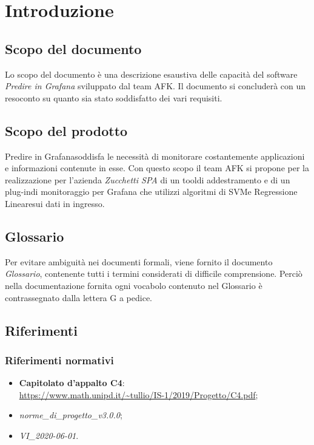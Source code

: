 \section{Introduzione}

\subsection{Scopo del documento}
Lo scopo del documento è una descrizione esaustiva delle capacità del software \textit{Predire in Grafana} sviluppato dal team AFK.
Il documento si concluderà con un resoconto su quanto sia stato soddisfatto dei vari requisiti.

\subsection{Scopo del prodotto}
Predire in Grafana\glo soddisfa le necessità di monitorare costantemente applicazioni e informazioni contenute in esse. 
Con questo scopo il team AFK si propone per la realizzazione per l’azienda \textit{Zucchetti SPA} di un tool\glo di addestramento e di un plug-in\glo di monitoraggio per Grafana che utilizzi algoritmi di SVM\glo e Regressione Lineare\glo sui dati in ingresso.


\subsection{Glossario}
Per evitare ambiguità nei documenti formali, viene fornito il documento \textit{Glossario}, contenente tutti i termini considerati di difficile comprensione. Perciò nella documentazione fornita ogni vocabolo contenuto nel Glossario è contrassegnato dalla lettera G a pedice.

\subsection{Riferimenti}

\subsubsection{Riferimenti normativi}
\begin{itemize}
	\item \textbf{Capitolato d'appalto C4}: \\
	\url{https://www.math.unipd.it/~tullio/IS-1/2019/Progetto/C4.pdf};
	\item \textit{norme\_di\_progetto\_v3.0.0};
	\item \textit{VI\_2020-06-01}.
\end{itemize}

